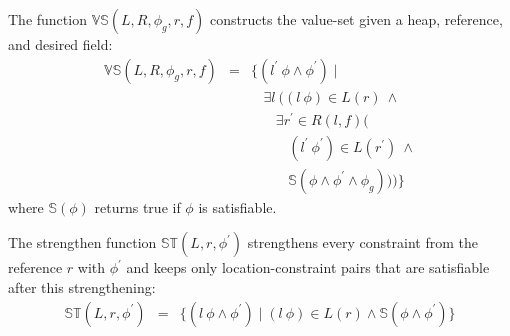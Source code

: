 The function $\mathbb{VS}(L,R,\phi_g,r,f)$ constructs the value-set given a
heap, reference, and desired field:
\[
\begin{array}{rcl}
  \mathbb{VS}(L,R,\phi_g,r,f) & = & \{(l^\prime\ \phi\wedge\phi^\prime) \mid \\
  & & \ \ \ \ \exists l\ ((l\ \phi) \in L(r)\ \wedge \\
  & & \ \ \ \ \ \ \ \ \exists r^\prime \in R(l,f) ( \\
  & & \ \ \ \ \ \ \ \ \ \ \ \ (l^\prime\ \phi^\prime) \in L(r^\prime)\ \wedge\\
  & & \ \ \ \ \ \ \ \ \ \ \ \ \mathbb{S}(\phi\wedge\phi^\prime\wedge \phi_g)))\}
\end{array}
\]
where $\mathbb{S}(\phi)$ returns true if $\phi$ is satisfiable.

The strengthen function $\mathbb{ST}(L,r,\phi^\prime)$ strengthens every
constraint from the reference $r$ with $\phi^\prime$ and keeps only location-constraint
pairs that are satisfiable after this strengthening:
\[
\begin{array}{rcl} 
\mathbb{ST}(L,r,\phi^\prime) & = & \{ (l\ \phi\wedge\phi^\prime) \mid 
(l\ \phi)\in L(r)\wedge\mathbb{S}(\phi\wedge\phi^\prime) \}
\end{array}
\]






